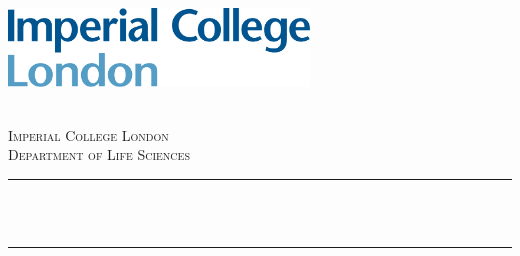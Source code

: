 \begin{titlepage}

    \newcommand{\HRule}{\rule{\linewidth}{0.5mm}} %
    
    
    \includegraphics[width=8cm]{title/logo.png}\\[1cm] %
     
    
    \center %
    
    \quad\\[1.5cm]
    \textsc{\Large Imperial College London}\\[0.5cm] %
    \textsc{\large Department of Life Sciences}\\[0.5cm] %
    
    \makeatletter
    \HRule \\[0.4cm]
    { \huge \bfseries \@title}\\[0.4cm] %
    \HRule \\[1.5cm]
     
    

\end{titlepage}
